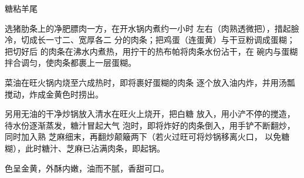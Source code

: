 \begin{recipe}{糖粘羊尾}

\ingredients



\cooking

\step 	选猪肋条上的净肥膘肉一方，在开水锅内煮约一小时 左右（肉熟透微把），措起臉冷，切成长一寸二、宽厚各二 分的肉条；把鸡蛋（连蛋黄）与干豆粉调成蛋糊；把切好后 的肉条在沸水内煮热，用拧干的热布帕将肉条水份沾干，在 碗内与蛋糊拌合调匀，使肉条都裹上一层蛋糊。

\step 	菜油在旺火锅内烧至六成热时，即将裹好蛋糊的肉条 逐个放入油内炸，并用汤瓢搅动，炸成金黄色时捞出。

\step 	另用无油的干净炒锅放入清水在旺火上烧开，把白糖 放入，用小浐不停的搅造，待水份逐渐蒸发，糖汁冒起大气 泡时，即将炸好的肉条倒入，用手铲不断翻炒，同时加入熟 芝麻细末，再翻炒颠簸两下（若火过旺可将炒锅移离火口， 以免糖糊），此时糖汁、芝麻已沾满肉条，即起锅。

\notes

色呈金黄，外酥内嫩，油而不腻，香甜可口。

\end{recipe}

